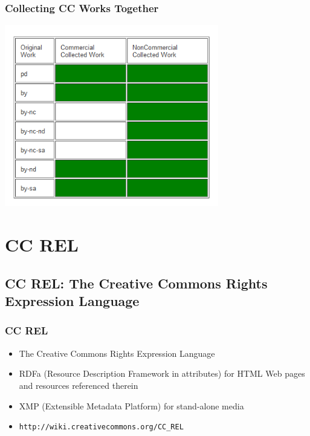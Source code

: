 \documentclass[mathserif,xcolor=dvipsnames,hyperref={bookmarks=true}]{beamer}
\begin{document}
    \begin{frame}[t]
        \frametitle{Collecting CC Works Together}
        \begin{center}
          \includegraphics[width=0.7\textwidth]{figures/collecting_cc_works_together.png}
        \end{center}
    \end{frame}

\section{CC REL}
\begin{frame}[t]
\end{frame}

    \subsection{CC REL: The Creative Commons Rights Expression Language}
    \begin{frame}[t]
        \frametitle{CC REL}
        \begin{itemize}
            \item The Creative Commons Rights Expression Language
            \item RDFa (Resource Description Framework in attributes) for HTML Web pages and resources referenced therein
            \item XMP (Extensible Metadata Platform) for stand-alone media
            \item \texttt{http://wiki.creativecommons.org/CC\_REL}
        \end{itemize}
    \end{frame}
\end{document}
